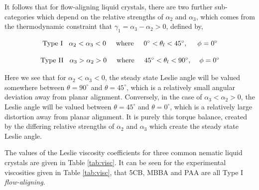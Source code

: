 \noindent It follows that for flow-aligning liquid crystals, there are two further sub-categories which depend on the relative strengths of $\alpha_2$ and $\alpha_3$, which comes from the thermodynamic constraint that $\gamma_1=\alpha_3-\alpha_ 2>0$, defined by,

\begin{equation}
\textrm{Type I}\hspace{0.3cm}\alpha_2<\alpha_3<0\hspace{0.5cm}\textrm{where}\hspace{0.5cm}0^{\circ}<\theta_l<45^{\circ},\hspace{0.5cm}\phi=0^{\circ}
\end{equation}

\begin{equation}
\textrm{Type II}\hspace{0.3cm}\alpha_3>\alpha_2>0\hspace{0.5cm}\textrm{where}\hspace{0.5cm}45^{\circ}<\theta_l<90^{\circ},\hspace{0.4cm}\phi=0^{\circ}
\end{equation}

\noindent Here we see that for $\alpha_2<\alpha_3<0$, the steady state Leslie angle will be valued somewhere between $\theta=90^{\circ}$ and $\theta=45^{\circ}$, which is a relatively small angular deviation away from planar alignment. Conversely, in the case of $\alpha_3<\alpha_2>0$, the Leslie angle will be valued between $\theta=45^{\circ}$ and $\theta=0^{\circ}$, which is a relatively large distortion away from planar alignment. It is purely this torque balance, created by the differing relative strengths of $\alpha_2$ and $\alpha_3$ which create the steady state Leslie angle.

The values of the Leslie viscosity coefficients for three common nematic liquid crystals are given in Table \ref{tab:visc}. It can be seen for the experimental viscosities given in Table \ref{tab:visc}, that 5CB, MBBA and PAA are all Type I \textit{flow-aligning}.

